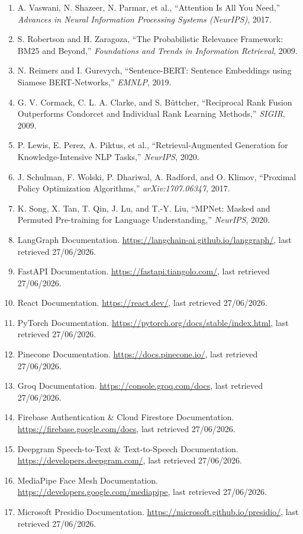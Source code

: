 \documentclass[12pt,a4paper,oneside]{report}
\begin{document}
\begin{enumerate}[leftmargin=2em]
  \item A. Vaswani, N. Shazeer, N. Parmar, et al., ``Attention Is All You Need,''
    \textit{Advances in Neural Information Processing Systems (NeurIPS)}, 2017.
  \item S. Robertson and H. Zaragoza, ``The Probabilistic Relevance Framework: BM25 and
    Beyond,'' \textit{Foundations and Trends in Information Retrieval}, 2009.
  \item N. Reimers and I. Gurevych, ``Sentence-BERT: Sentence Embeddings using Siamese
    BERT-Networks,'' \textit{EMNLP}, 2019.
  \item G. V. Cormack, C. L. A. Clarke, and S. Büttcher, ``Reciprocal Rank Fusion Outperforms
    Condorcet and Individual Rank Learning Methods,'' \textit{SIGIR}, 2009.
  \item P. Lewis, E. Perez, A. Piktus, et al., ``Retrieval-Augmented Generation for
    Knowledge-Intensive NLP Tasks,'' \textit{NeurIPS}, 2020.
  \item J. Schulman, F. Wolski, P. Dhariwal, A. Radford, and O. Klimov, ``Proximal Policy
    Optimization Algorithms,'' \textit{arXiv:1707.06347}, 2017.
  \item K. Song, X. Tan, T. Qin, J. Lu, and T.-Y. Liu, ``MPNet: Masked and Permuted
    Pre-training for Language Understanding,'' \textit{NeurIPS}, 2020.
  \item LangGraph Documentation.
    \url{https://langchain-ai.github.io/langgraph/}, last retrieved 27/06/2026.
  \item FastAPI Documentation.
    \url{https://fastapi.tiangolo.com/}, last retrieved 27/06/2026.
  \item React Documentation.
    \url{https://react.dev/}, last retrieved 27/06/2026.
  \item PyTorch Documentation.
    \url{https://pytorch.org/docs/stable/index.html}, last retrieved 27/06/2026.
  \item Pinecone Documentation.
    \url{https://docs.pinecone.io/}, last retrieved 27/06/2026.
  \item Groq Documentation.
    \url{https://console.groq.com/docs}, last retrieved 27/06/2026.
  \item Firebase Authentication \& Cloud Firestore Documentation.
    \url{https://firebase.google.com/docs}, last retrieved 27/06/2026.
  \item Deepgram Speech-to-Text \& Text-to-Speech Documentation.
    \url{https://developers.deepgram.com/}, last retrieved 27/06/2026.
  \item MediaPipe Face Mesh Documentation.
    \url{https://developers.google.com/mediapipe}, last retrieved 27/06/2026.
  \item Microsoft Presidio Documentation.
    \url{https://microsoft.github.io/presidio/}, last retrieved 27/06/2026.
\end{enumerate}
\end{document}

